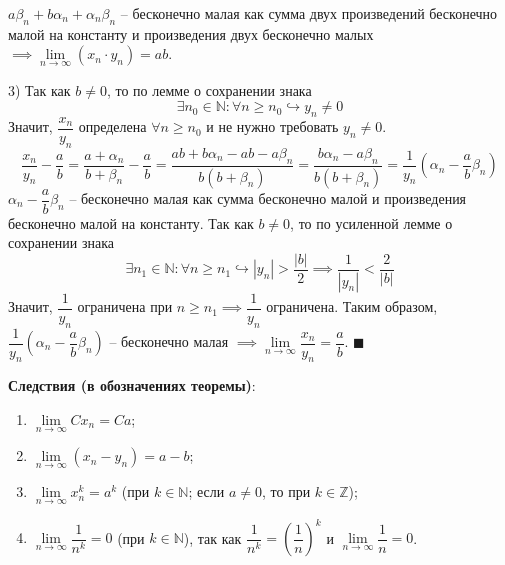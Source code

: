 \documentclass[12pt, a4paper, reqno]{article}
\begin{document}
    $a\beta_n + b\alpha_n + \alpha_n\beta_n$ -- бесконечно малая как сумма двух произведений
    бесконечно малой на константу и произведения двух бесконечно малых $\implies
    \lim\limits_{n\to\infty} (x_n\cdot y_n) = ab$.

    3) Так как $b \neq 0$, то по лемме о сохранении знака
    \begin{equation*}
        \exists n_0\in\mathbb{N}: \forall n \geq n_0 \hookrightarrow y_n \neq 0
    \end{equation*}
    Значит, $\dfrac{x_n}{y_n}$ определена $\forall n \geq n_0$ и не нужно требовать $y_n \neq 0$.
    \begin{equation*}
        \dfrac{x_n}{y_n} - \dfrac{a}{b} = \dfrac{a + \alpha_n}{b + \beta_n} - \dfrac{a}{b} =
        \dfrac{ab + b\alpha_n - ab - a\beta_n}{b(b + \beta_n)} =
        \dfrac{b\alpha_n - a\beta_n}{b(b +\beta_n)} = \dfrac{1}{y_n}
        \left(\alpha_n - \dfrac{a}{b}\beta_n\right)
    \end{equation*}
    $\alpha_n - \dfrac{a}{b}\beta_n$ -- бесконечно малая как сумма бесконечно малой и произведения
    бесконечно малой на константу. Так как $b \neq 0$, то по усиленной лемме о сохранении знака
    \begin{equation*}
        \exists n_1\in\mathbb{N}: \forall n \geq n_1 \hookrightarrow |y_n| > \dfrac{|b|}{2} \implies
        \dfrac{1}{|y_n|} < \dfrac{2}{|b|}
    \end{equation*}
    Значит, $\dfrac{1}{y_n}$ ограничена при $n \geq n_1 \implies \dfrac{1}{y_n}$ ограничена.
    Таким образом, $\dfrac{1}{y_n}(\alpha_n - \dfrac{a}{b}\beta_n)$ -- бесконечно малая $\implies
    \lim\limits_{n\to\infty} \dfrac{x_n}{y_n} = \dfrac{a}{b}$. $\blacksquare$

    \textbf{Следствия (в обозначениях теоремы)}:
    \begin{enumerate}
        \item $\lim\limits_{n\to\infty} Cx_n = Ca$;
        \item $\lim\limits_{n\to\infty} (x_n - y_n) = a - b$;
        \item $\lim\limits_{n\to\infty} x_{n}^{k} = {a}^k$ (при $k\in\mathbb{N}$; если $a \neq 0$,
              то при $k\in\mathbb{Z}$);
        \item $\lim\limits_{n\to\infty} \dfrac{1}{n^k} = 0$ (при $k\in\mathbb{N}$), так как
              $\dfrac{1}{n^k} = \left(\dfrac{1}{n}\right)^k$ и $\lim\limits_{n\to\infty} \dfrac{1}{n}
              = 0$.
    \end{enumerate}
\end{document}
